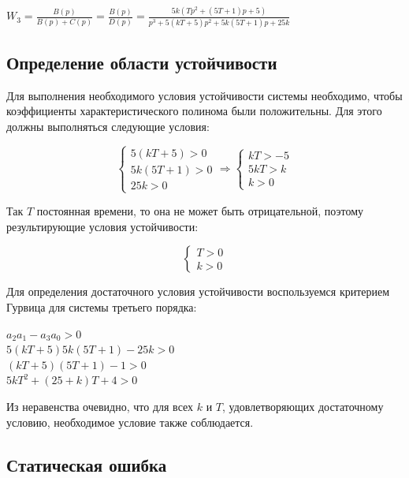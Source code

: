 \documentclass[14pt,a4paper,report]{report}
\begin{document}
\begin{center}
$W_3=\frac{B(p)}{B(p)+C(p)}=\frac{B(p)}{D(p)}=\frac{5k(Tp^2+(5T+1)p+5)}{p^3+5(kT+5)p^2+5k(5T+1)p+25k}$
\end{center}

\subsection{Определение области устойчивости}

Для выполнения необходимого условия устойчивости системы необходимо, чтобы коэффициенты характеристического полинома были положительны. Для этого должны выполняться следующие условия:

\begin{equation*}
\begin{cases}
	\text{$5(kT+5)>0$} \\
	\text{$5k(5T+1)>0$} \\
	\text{$25k>0$}
\end{cases}
\Longrightarrow
\begin{cases}
	\text{$kT>-5$} \\
	\text{$5kT>k$} \\
	\text{$k>0$}
\end{cases}
\end{equation*}

Так $T$ постоянная времени, то она не может быть отрицательной, поэтому результирующие условия устойчивости:

\begin{equation*}
\begin{cases}
	\text{$T>0$} \\
	\text{$k>0$}
\end{cases}
\end{equation*}

Для определения достаточного условия устойчивости воспользуемся критерием Гурвица для системы третьего порядка:

\begin{center}
$a_2a_1-a_3a_0>0$ \\
$5(kT+5)5k(5T+1)-25k>0$ \\
$(kT+5)(5T+1)-1>0$ \\
$5kT^2+(25+k)T+4>0$ \\
\end{center}

Из неравенства очевидно, что для всех $k$ и $T$, удовлетворяющих достаточному условию, необходимое условие также соблюдается.

\subsection{Статическая ошибка}
\end{document}
